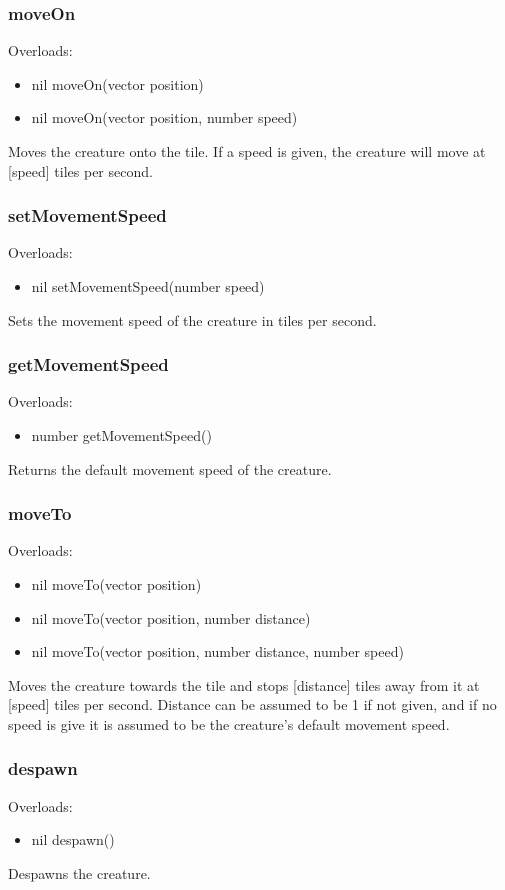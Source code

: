 \documentclass{book}
\newenvironment{ulist}
	{\begin{itemize}
			\itemsep0em}
	{\end{itemize}}
\begin{document}
\subsubsection{moveOn}
Overloads:
\begin{ulist}
	\item nil moveOn(vector position)
	\item nil moveOn(vector position, number speed)
\end{ulist}
Moves the creature onto the tile. If a speed is given, the creature will move at [speed] tiles per second.

\subsubsection{setMovementSpeed}
Overloads:
\begin{ulist}
	\item nil setMovementSpeed(number speed)
\end{ulist}
Sets the movement speed of the creature in tiles per second.

\subsubsection{getMovementSpeed}
Overloads:
\begin{ulist}
	\item number getMovementSpeed()
\end{ulist}
Returns the default movement speed of the creature.

\subsubsection{moveTo}
Overloads:
\begin{ulist}
	\item nil moveTo(vector position)
	\item nil moveTo(vector position, number distance)
	\item nil moveTo(vector position, number distance, number speed)
\end{ulist}
Moves the creature towards the tile and stops [distance] tiles away from it at [speed] tiles per second. Distance can be assumed to be 1 if not given, and if no speed is give it is assumed to be the creature's default movement speed.

\subsubsection{despawn}
Overloads:
\begin{ulist}
	\item nil despawn()
\end{ulist}
Despawns the creature.
\end{document}
